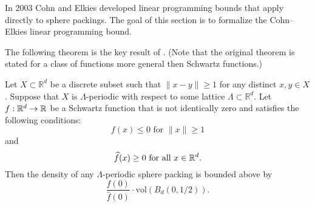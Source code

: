 In 2003 Cohn and Elkies \cite{ElkiesCohn}  developed  linear programming bounds that apply directly to sphere packings. The goal of this section is to formalize the Cohn--Elkies linear programming bound.

The following theorem is the key result of \cite{ElkiesCohn}. (Note that the original theorem is stated for a class of functions more general then Schwartz functions.)
\begin{theorem}\label{thm:Cohn-Elkies}\leanok

Let $X\subset\mathbb{R}^d$ be a discrete subset such that $\|x-y\|\geq 1$ for any distinct $x,y\in X$. Suppose that $X$ is $\Lambda$-periodic with respect to some lattice $\Lambda\subset\mathbb{R}^d$. Let $f:\mathbb{R}^d\to\mathbb{R}$ be a Schwartz function that is not identically zero and satisfies the following conditions:
\begin{equation}\label{eqn:Cohn-Elkies-condition-1}f(x)\leq 0\mbox{ for } \|x\|\geq 1\end{equation} and
\begin{equation}\label{eqn:Cohn-Elkies-condition-2}\widehat{f}(x)\geq0\mbox{ for all } x\in\mathbb{R}^d.\end{equation}
  Then the density of any $\Lambda$-periodic sphere packing is bounded above by $$\frac{f(0)}{\widehat{f}(0)}\cdot \mathrm{vol}(B_d(0,1/2)).$$
\end{theorem}
